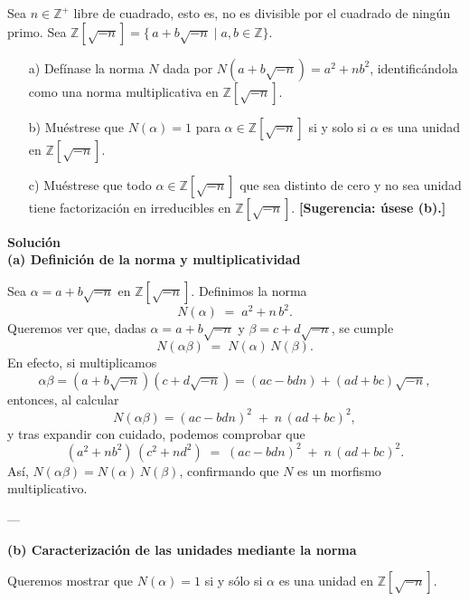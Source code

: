 Sea $n \in \mathbb{Z}^+$ libre de cuadrado, esto es, no es divisible por el cuadrado de ningún primo. Sea $\mathbb{Z}[\sqrt{-n}] = \{\,a + b\sqrt{-n}\mid a,b \in \mathbb{Z}\}$.
    
    \begin{enumerate}
        \item[a)] Defínase la norma $N$ dada por $N(a + b\sqrt{-n}) = a^2 + nb^2$, identificándola como una norma multiplicativa en $\mathbb{Z}[\sqrt{-n}]$.
        
        \item[b)] Muéstrese que $N(\alpha) = 1$ para $\alpha \in \mathbb{Z}[\sqrt{-n}]$ si y solo si $\alpha$ es una unidad en $\mathbb{Z}[\sqrt{-n}]$.
        
        \item[c)] Muéstrese que todo $\alpha \in \mathbb{Z}[\sqrt{-n}]$ que sea distinto de cero y no sea unidad tiene factorización en irreducibles en $\mathbb{Z}[\sqrt{-n}]$. \textbf{[Sugerencia: úsese (b).]}
    \end{enumerate}

\textbf{Solución} \\

\noindent
\textbf{(a) Definición de la norma y multiplicatividad}

Sea $\alpha = a + b\sqrt{-n}$ en $\mathbb{Z}[\sqrt{-n}]$. Definimos la norma
\[
N(\alpha) \;=\; a^2 + n\,b^2.
\]
Queremos ver que, dadas $\alpha = a + b\sqrt{-n}$ y $\beta = c + d\sqrt{-n}$, se cumple
\[
N(\alpha \beta) \;=\; N(\alpha)\, N(\beta).
\]
En efecto, si multiplicamos
\[
\alpha \beta = (a + b\sqrt{-n})(c + d\sqrt{-n}) = (ac - bdn) + (ad + bc)\sqrt{-n},
\]
entonces, al calcular
\[
N(\alpha \beta) = (ac - bdn)^2 \;+\; n\,(ad + bc)^2,
\]
y tras expandir con cuidado, podemos comprobar que
\[
(a^2 + nb^2)\,(c^2 + nd^2) 
\;=\; (ac - bdn)^2 \;+\; n\,(ad + bc)^2.
\]
Así, $N(\alpha\beta) = N(\alpha)\,N(\beta)$, confirmando que $N$ es un morfismo multiplicativo.

---

\noindent
\textbf{(b) Caracterización de las unidades mediante la norma}

Queremos mostrar que $N(\alpha) = 1$ si y sólo si $\alpha$ es una unidad en $\mathbb{Z}[\sqrt{-n}]$. 

